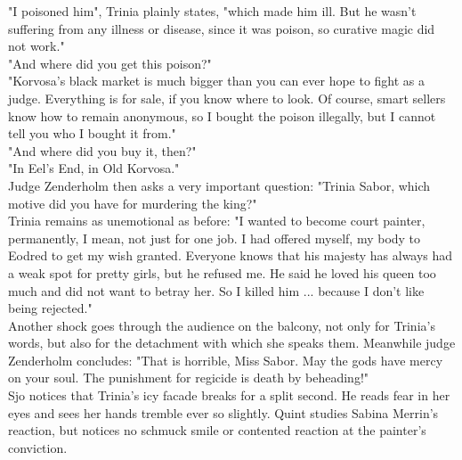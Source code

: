 "I poisoned him", Trinia plainly states, "which made him ill. But he wasn't suffering from any illness or disease, since it was poison, so curative magic did not work."\\

"And where did you get this poison?"\\

"Korvosa's black market is much bigger than you can ever hope to fight as a judge. Everything is for sale, if you know where to look. Of course, smart sellers know how to remain anonymous, so I bought the poison illegally, but I cannot tell you who I bought it from."\\

"And where did you buy it, then?"\\

"In Eel's End, in Old Korvosa."\\

Judge Zenderholm then asks a very important question: "Trinia Sabor, which motive did you have for murdering the king?"\\

Trinia remains as unemotional as before: "I wanted to become court painter, permanently, I mean, not just for one job. I had offered myself, my body to Eodred to get my wish granted. Everyone knows that his majesty has always had a weak spot for pretty girls, but he refused me. He said he loved his queen too much and did not want to betray her. So I killed him ... because I don't like being rejected."\\

Another shock goes through the audience on the balcony, not only for Trinia's words, but also for the detachment with which she speaks them. Meanwhile judge Zenderholm concludes: "That is horrible, Miss Sabor. May the gods have mercy on your soul. The punishment for regicide is death by beheading!"\\

Sjo notices that Trinia's icy facade breaks for a split second. He reads fear in her eyes and sees her hands tremble ever so slightly. Quint studies Sabina Merrin's reaction, but notices no schmuck smile or contented reaction at the painter's conviction.\\

